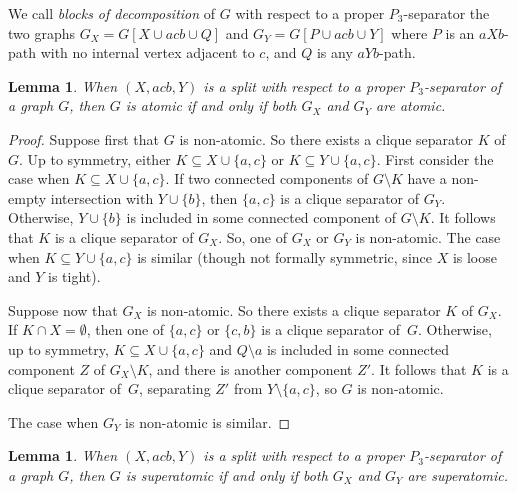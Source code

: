\documentclass[11pt]{article}
\newtheorem{lemma}[theo]{Lemma}
\newcommand{\sm}{\setminus}
\begin{document}
We call \emph{blocks of decomposition} of $G$ with respect to a proper $P_3$-separator the two graphs $G_X = G[X \cup acb \cup Q]$ and $G_Y = G[P \cup acb \cup Y ]$ where $P$ is an $aXb$-path with no internal vertex adjacent to $c$, and $Q$ is any $aYb$-path.

\begin{lemma}
 \label{l:decProperP3SepAtomic} 
  When $(X, acb, Y)$ is a split with respect to a proper $P_3$-separator of a graph $G$, then $G$ is atomic if and only if both $G_X$ and $G_Y$ are atomic.
\end{lemma}

\begin{proof}
  Suppose first that $G$ is non-atomic.   
  So there exists  a clique separator $K$ of $G$. 
  Up to symmetry, either $K\subseteq X \cup \{a, c\}$ or $K\subseteq Y \cup \{a, c\}$.  
  First consider the case when $K\subseteq X \cup \{a, c\}$. 
  If two connected components of $G\sm K$ have a non-empty intersection with $Y\cup \{b\}$, then $\{a, c\}$ is a clique separator of $G_Y$.  
  Otherwise, $Y\cup \{b\}$ is included in some connected component of $G\sm K$.   
  It follows that $K$ is a clique separator of $G_X$.  So, one of  $G_X$ or $G_Y$ is non-atomic.   
  The case when $K\subseteq Y \cup \{a, c\}$ is similar (though not formally symmetric, since $X$ is loose and $Y$ is tight).
  
  Suppose now that  $G_X$ is non-atomic.  
  So there exists a clique separator $K$ of $G_X$.  
  If $K\cap X = \emptyset$, then one of $\{a, c\}$ or $\{c, b\}$ is a clique separator of~$G$. 
  Otherwise, up to symmetry, $K\subseteq X\cup \{a, c\}$ and $Q\sm a$ is included in some connected component $Z$ of $G_X\sm K$, and there is another component $Z'$. It follows that $K$ is a clique separator of~$G$, separating $Z'$ from $Y\sm \{a, c\}$, so $G$ is non-atomic.
  
  The case when $G_Y$ is non-atomic is similar.  
\end{proof}


\begin{lemma}
 \label{l:decProperP3Sep-2Sep} 
  When $(X, acb, Y)$ is a split with respect to a proper $P_3$-separator of a graph $G$, then $G$ is superatomic if and only if both $G_X$ and $G_Y$ are superatomic.
\end{lemma}
\end{document}
